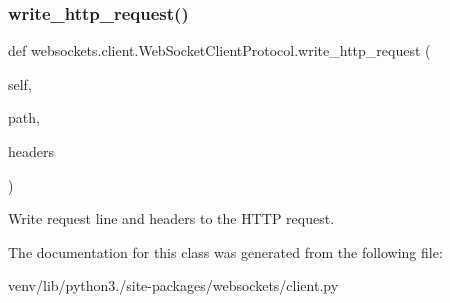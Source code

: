 \subsubsection{\texorpdfstring{write\+\_\+http\+\_\+request()}{write\_http\_request()}}
{\footnotesize\ttfamily def websockets.\+client.\+Web\+Socket\+Client\+Protocol.\+write\+\_\+http\+\_\+request (\begin{DoxyParamCaption}\item[{}]{self,  }\item[{}]{path,  }\item[{}]{headers }\end{DoxyParamCaption})}

\begin{DoxyVerb}Write request line and headers to the HTTP request.\end{DoxyVerb}
 

The documentation for this class was generated from the following file\+:\begin{DoxyCompactItemize}
\item 
venv/lib/python3./site-\/packages/websockets/client.\+py\end{DoxyCompactItemize}
